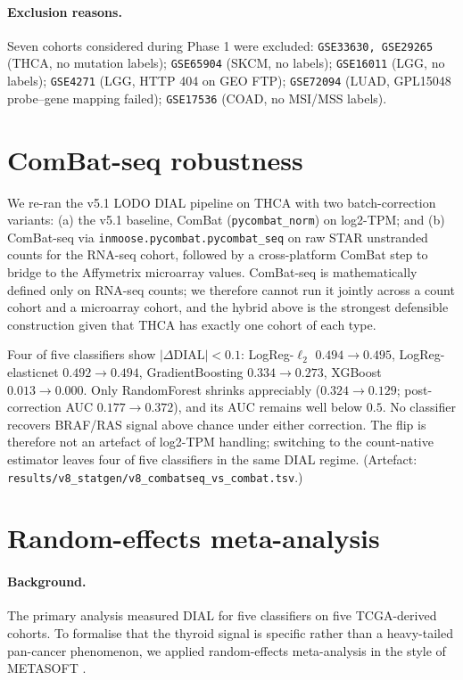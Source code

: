 \documentclass[11pt,a4paper]{article}
\begin{document}
\paragraph{Exclusion reasons.} Seven cohorts considered during Phase
1 were excluded: \texttt{GSE33630, GSE29265} (THCA, no mutation
labels); \texttt{GSE65904} (SKCM, no labels); \texttt{GSE16011} (LGG,
no labels); \texttt{GSE4271} (LGG, HTTP 404 on GEO FTP);
\texttt{GSE72094} (LUAD, GPL15048 probe--gene mapping failed);
\texttt{GSE17536} (COAD, no MSI/MSS labels).

\section{ComBat-seq robustness}
\label{sec:S2}

We re-ran the v5.1 LODO DIAL pipeline on THCA with two
batch-correction variants: (a) the v5.1 baseline, ComBat
(\texttt{pycombat\_norm}) on log2-TPM; and (b) ComBat-seq
\citep{zhang2020combatseq} via \texttt{inmoose.pycombat.pycombat\_seq}
on raw STAR unstranded counts for the RNA-seq cohort, followed by a
cross-platform ComBat step to bridge to the Affymetrix microarray
values. ComBat-seq is mathematically defined only on RNA-seq counts;
we therefore cannot run it jointly across a count cohort and a
microarray cohort, and the hybrid above is the strongest defensible
construction given that THCA has exactly one cohort of each type.

Four of five classifiers show $|\Delta\mathrm{DIAL}| < 0.1$:
LogReg-$\ell_2$ $0.494 \to 0.495$,
LogReg-elasticnet $0.492 \to 0.494$,
GradientBoosting $0.334 \to 0.273$,
XGBoost $0.013 \to 0.000$. Only RandomForest shrinks appreciably
($0.324 \to 0.129$; post-correction AUC $0.177 \to 0.372$), and its
AUC remains well below $0.5$. No classifier recovers BRAF/RAS signal
above chance under either correction. The flip is therefore not an
artefact of log2-TPM handling; switching to the count-native estimator
leaves four of five classifiers in the same DIAL regime. (Artefact:
\texttt{results/v8\_statgen/v8\_combatseq\_vs\_combat.tsv}.)

\section{Random-effects meta-analysis}
\label{sec:S3}

\paragraph{Background.} The primary analysis measured DIAL for five
classifiers on five TCGA-derived cohorts. To formalise that the
thyroid signal is specific rather than a heavy-tailed pan-cancer
phenomenon, we applied random-effects meta-analysis in the style of
METASOFT \citep{han2011metasoft,han2012mvalue,lee2017metasoft}.
\end{document}
